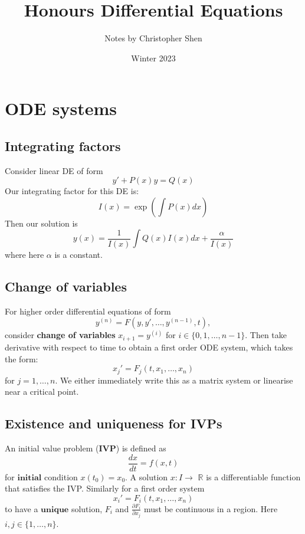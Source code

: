\documentclass{article}
\title{Honours Differential Equations}
\author{Notes by Christopher Shen}
\date{Winter 2023}
\begin{document}
\maketitle
\newpage

\tableofcontents
\newpage

\pagestyle{fancy}
\fancyhead{}

\section{ODE systems}

\subsection{Integrating factors}
Consider linear DE of form
$$y'+P(x)y=Q(x)$$
Our integrating factor for this DE is:
$$I(x)=\exp\left(\int P(x)dx\right)$$
Then our solution is
$$y(x)=\frac{1}{I(x)} \int Q(x)I(x)dx + \frac{\alpha}{I(x)}$$
where here $\alpha$ is a constant.

\subsection{Change of variables}
For higher order differential equations of form $$y^{(n)} = F(y, y', \dots, y^{(n-1)}, t),$$
consider \textbf{change of variables} $x_{i+1} = y^{(i)}$ for $i \in \{0, 1, \dots, n-1\}$.
Then take derivative with respect to time to obtain a first order ODE system, which takes the form:
$$x_{j}'=F_j(t, x_1, \dots, x_n)$$ for $j=1, \dots, n$.
We either immediately write this as a matrix system or linearise near a critical point.

\subsection{Existence and uniqueness for IVPs}
An initial value problem ($\textbf{IVP}$) is defined as
$$\frac{dx}{dt} = f(x, t)$$ for $\textbf{initial}$ condition $x(t_0)=x_0$.
A solution $x:I \rightarrow$ $\mathbb{R}$ is a differentiable function that satisfies the IVP.
Similarly for a first order system $$x_{i}'=F_i(t, x_1, \dots, x_n)$$ to have a $\textbf{unique}$ solution,
$F_i$ and $\frac{\partial F_i}{\partial x_j}$
must be continuous in a region. Here $i, j \in \{1, \dots, n\}$.

\newpage
\end{document}
